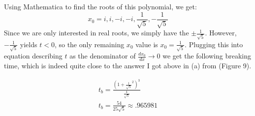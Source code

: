 \documentclass{article}
\begin{document}
Using Mathematica to find the roots of this polynomial, we get:
\begin{equation}
x_0 = i, i,-i, -i, \frac{1}{\sqrt{5}}, -\frac{1}{\sqrt{5}}
\end{equation}
Since we are only interested in real roots, we simply have the $\pm \frac{1}{\sqrt{5}}$. However, $-\frac{1}{\sqrt{5}}$ yields $t < 0$, so the only remaining $x_0$ value is $x_0 = \frac{1}{\sqrt{5}}$. Plugging this into equation describing $t$ as the denominator of $\frac{dx_0}{dx} \to 0$ we get the following breaking time, which is indeed quite close to the answer I got above in (a) from (Figure 9).
\begin{tcolorbox}[minipage,colback=white,arc=0pt,outer arc=0pt]
\begin{equation}
\begin{aligned}
t_b = \frac{(1+\frac{1}{\sqrt{5}}^2)^3}{\frac{4}{\sqrt{5}}}\\
t_b = \frac{54}{25\sqrt{5}} \approx .965981
\end{aligned}
\end{equation}
\end{tcolorbox}
\end{document}
